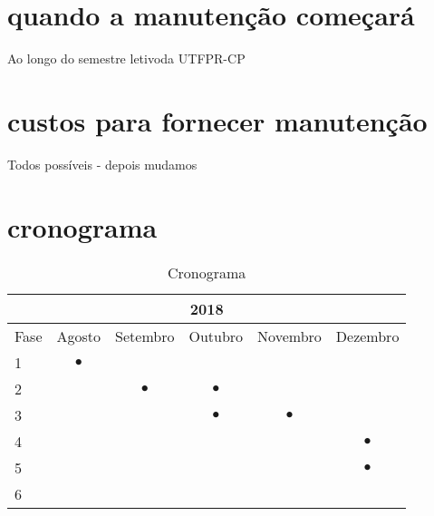 \section{quando a manutenção começará}
Ao longo do semestre letivoda UTFPR-CP
\section{custos para fornecer manutenção}
Todos possíveis - depois mudamos
\section{cronograma}
\begin{table}[!htb]
  \caption{Cronograma}
  \label{tab:cronograma}
  \begin{center}
	  \begin{tabular}{l||c|c|c|c|c}
	    \multicolumn{6}{c}{2018} \\ \hline \hline
	    {Fase}&  Agosto  &  Setembro & Outubro  & Novembro & Dezembro  \\ \hline
	    1    & $\bullet$ &           &          &          &           \\
	    2    &           & $\bullet$ & $\bullet$&          &           \\
	    3    &           &           & $\bullet$& $\bullet$&           \\
	    4    &           &           &          &          & $\bullet$ \\
	    5    &           &           &          &          & $\bullet$ \\
	    6    &           &           &          &          &           \\
	  \end{tabular}
	  \end{center}
\end{table}
